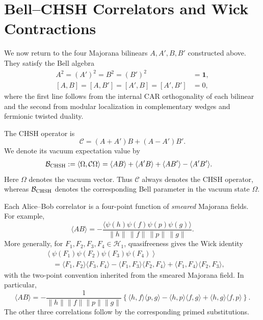 \documentclass[11pt]{article}
\begin{document}
\section{Bell--CHSH Correlators and Wick Contractions}
\label{sec:bell}

We now return to the four Majorana bilinears $A,A',B,B'$ constructed above. They satisfy the Bell algebra
\begin{align}
 A^2=(A')^2=B^2=(B')^2&=\mathbf 1,\\
 [A,B]=[A,B']=[A',B]=[A',B']&=0,
 \label{eq:Bellalgebra}
\end{align}
where the first line follows from the internal CAR orthogonality of each bilinear and the second from modular localization in complementary wedges and fermionic twisted duality.

The CHSH operator is
\begin{equation}
 \mathcal C=(A+A')B+(A-A')B'.
 \label{eq:CHSHoperator}
\end{equation}
We denote its vacuum expectation value by
\begin{align}
 \mathcal B_{\rm CHSH}
 :=\langle\Omega,\mathcal C\Omega\rangle
 &=\langle AB\rangle+\langle A'B\rangle
 +\langle AB'\rangle-\langle A'B'\rangle.
 \label{eq:CHSH}
\end{align}
Here $\Omega$ denotes the vacuum vector. Thus $\mathcal C$ always denotes the CHSH operator, whereas $\mathcal B_{\rm CHSH}$ denotes the corresponding Bell parameter in the vacuum state $\Omega$.

Each Alice--Bob correlator is a four-point function of \emph{smeared} Majorana fields. For example,
\begin{equation}
 \langle AB\rangle
 =-\frac{\langle
 \psi(h)\psi(f)\psi(p)\psi(g)
 \rangle}
 {\|h\|\,\|f\|\,\|p\|\,\|g\|}.
 \label{eq:ABfourpoint}
\end{equation}
More generally, for $F_1,F_2,F_3,F_4\in\mathcal H_1$, quasifreeness gives the Wick identity
\begin{align}
 &\left\langle
 \psi(F_1)\psi(F_2)\psi(F_3)\psi(F_4)
 \right\rangle
 \nonumber\\
 &\quad=
 \langle F_1,F_2\rangle\langle F_3,F_4\rangle
 -\langle F_1,F_3\rangle\langle F_2,F_4\rangle
 +\langle F_1,F_4\rangle\langle F_2,F_3\rangle,
 \label{eq:wick}
\end{align}
with the two-point convention inherited from the smeared Majorana field. In particular,
\begin{equation}
 \langle AB\rangle
 =-\frac{1}{\|h\|\|f\|\|p\|\|g\|}
 \left\{
 \langle h,f\rangle\langle p,g\rangle
 -\langle h,p\rangle\langle f,g\rangle
 +\langle h,g\rangle\langle f,p\rangle
 \right\}.
 \label{eq:ABexplicit}
\end{equation}
The other three correlations follow by the corresponding primed substitutions.
\end{document}
